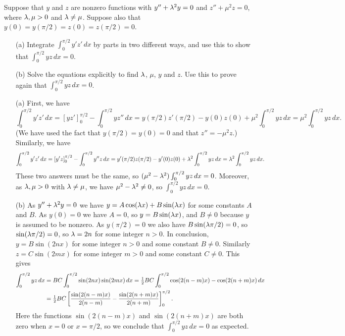 \documentclass[a4paper]{amsart}
\begin{document}
\begin{exercise}\label{ex-lin-orth}
 Suppose that $y$ and $z$ are nonzero functions with $y''+\lambda^2 y=0$
 and $z''+\mu^2 z=0$, where $\lambda,\mu>0$ and $\lambda\neq\mu$.  Suppose
 also that $y(0)=y(\pi/2)=z(0)=z(\pi/2)=0$.
 \begin{itemize}
  \item[(a)] Integrate $\int_0^{\pi/2}y'z'\,dx$ by parts in two
   different ways, and use this to show that
   $\int_0^{\pi/2}yz\,dx=0$.
  \item[(b)] Solve the equations explicitly to find $\lambda$, $\mu$, $y$
   and $z$.  Use this to prove again that $\int_0^{\pi/2}yz\,dx=0$.
 \end{itemize}
\end{exercise}
\begin{solution}\leavevmode
 \begin{itemize}
  \item[(a)] First, we have
   \[ \int_0^{\pi/2} y'z'\,dx
       = \left[yz'\right]_0^{\pi/2} -
          \int_0^{\pi/2} yz''\,dx 
       = y(\pi/2)z'(\pi/2) - y(0)z(0) + 
          \mu^2\int_0^{\pi/2} yz\,dx 
       = \mu^2\int_0^{\pi/2} yz\,dx.
   \]
   (We have used the fact that $y(\pi/2)=y(0)=0$ and that $z''=-\mu^2z$.)
   Similarly, we have 
   \[ \int_0^{\pi/2} y'z'\,dx
       = \left[y'z\right]_0^{\pi/2} -
          \int_0^{\pi/2} y''z\,dx 
       = y'(\pi/2)z(\pi/2) - y'(0)z(0) + 
          \lambda^2\int_0^{\pi/2} yz\,dx 
       = \lambda^2\int_0^{\pi/2} yz\,dx.
   \]
   These two answers must be the same, so
   $(\mu^2-\lambda^2)\int_0^{\pi/2}yz\,dx=0$.  Moreover, as $\lambda,\mu>0$
   with $\lambda\neq\mu$, we have $\mu^2-\lambda^2\neq 0$, so
   $\int_0^{\pi/2}yz\,dx=0$.
  \item[(b)] As $y''+\lambda^2y=0$ we have $y=A\cos(\lambda x)+B\sin(\lambda x)$
   for some constants $A$ and $B$.  As $y(0)=0$ we have $A=0$, so
   $y=B\sin(\lambda x)$, and $B\neq 0$ because $y$ is assumed to be
   nonzero.  As $y(\pi/2)=0$ we also have $B\sin(\lambda\pi/2)=0$, so 
   $\sin(\lambda\pi/2)=0$, so $\lambda=2n$ for some integer $n>0$.  In
   conclusion, $y=B\sin(2nx)$ for some integer $n>0$ and some constant
   $B\neq 0$.  Similarly $z=C\sin(2mx)$ for some integer $m>0$ and
   some constant $C\neq 0$.  This gives
   \begin{align*}
    \int_0^{\pi/2}yz\,dx
     &= BC\int_0^{\pi/2}\sin(2nx)\sin(2mx)\,dx 
      = \tfrac{1}{2} BC \int_0^{\pi/2} \cos(2(n-m)x) - \cos(2(n+m)x)\,dx \\
     &= \tfrac{1}{2} BC\left[\frac{\sin(2(n-m)x)}{2(n-m)} - 
                      \frac{\sin(2(n+m)x)}{2(n+m)}\right]_0^{\pi/2}.
   \end{align*}
   Here the functions $\sin(2(n-m)x)$ and $\sin(2(n+m)x)$ are both
   zero when $x=0$ or $x=\pi/2$, so we conclude that
   $\int_0^{\pi/2}yz\,dx=0$ as expected.
 \end{itemize}
\end{solution}
\end{document}
